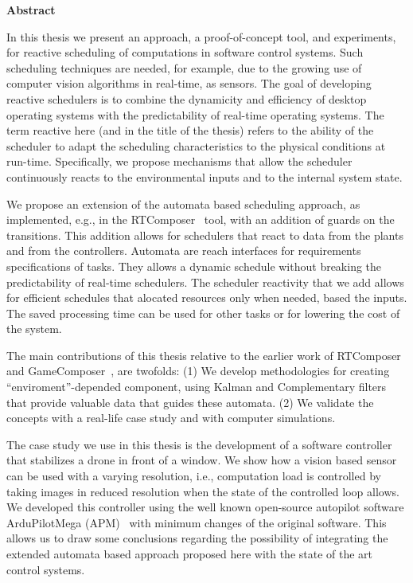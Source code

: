 \documentclass[../hodai_thesis.tex]{subfiles}
\begin{document}
\begin{center}
\LARGE \textbf{Abstract}
\end{center}

In this thesis we present an approach, a proof-of-concept tool, and experiments, for reactive scheduling of computations in software control systems. 
Such scheduling techniques are needed, for example, due to the growing use of computer vision algorithms in real-time, as sensors.
The goal of developing reactive schedulers is to combine the dynamicity and efficiency of desktop operating systems with the predictability of real-time operating systems.
The term reactive here (and in the title of the thesis) refers to the ability of the scheduler to adapt the scheduling characteristics to the physical conditions at run-time. 
Specifically, we propose mechanisms that allow the scheduler continuously reacts to the environmental inputs and to the internal system state. 

We propose an extension of the automata based scheduling approach, as implemented, e.g., in the RTComposer~\cite{RTComposer} tool, with an addition of guards on the
transitions. This addition allows for schedulers that react to data from the plants and from the controllers. Automata are reach interfaces for requirements specifications of tasks. They
allows a dynamic schedule without breaking the predictability of real-time schedulers. The scheduler reactivity that we add allows for efficient schedules that 
alocated resources only when needed, based the inputs. The saved processing time can be used for other tasks or for lowering the cost of the system.

The main contributions of this thesis relative to the earlier work of RTComposer~\cite{RTComposer} and GameComposer~\cite{Merav}, are twofolds: (1) We develop methodologies for
creating ``enviroment''-depended component, using Kalman and Complementary filters that provide valuable data that guides these automata. (2) We validate the concepts with a real-life 
case study and with computer simulations.

The case study we use in this thesis is the development of a software controller that stabilizes a drone in front of a window. We show how a vision based sensor can be used with a varying resolution, i.e.,
computation load is controlled by taking images in reduced resolution when the state of the controlled loop allows. We developed this controller using the well known 
open-source autopilot software ArduPilotMega (APM)~\cite{APM} with minimum changes of the original software. This allows us to draw some conclusions regarding the possibility of integrating the extended 
automata based approach proposed here with the state of the art control systems.
\end{document}
